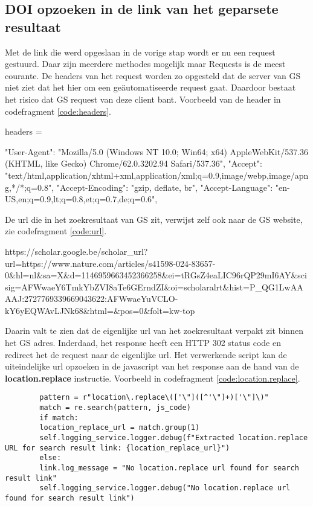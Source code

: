 \subsection{DOI opzoeken in de link van het geparsete resultaat}
Met de link die werd opgeslaan in de vorige stap wordt er nu een request gestuurd. Daar zijn meerdere methodes mogelijk maar Requests \textcite{Requests2025} is de meest courante. De headers van het request worden zo opgesteld dat de server van GS niet ziet dat het hier om een geäutomatiseerde request gaat. Daardoor bestaat het risico dat GS request van deze client bant. Voorbeeld van de header in codefragment \ref{code:headers}.\\
\begin{listing}headers = {
        "User-Agent": "Mozilla/5.0 (Windows NT 10.0; Win64; x64) AppleWebKit/537.36 (KHTML, like Gecko) Chrome/62.0.3202.94 Safari/537.36",
        "Accept": "text/html,application/xhtml+xml,application/xml;q=0.9,image/webp,image/apng,*/*;q=0.8",
        "Accept-Encoding": "gzip, deflate, br",
        "Accept-Language": "en-US,en;q=0.9,lt;q=0.8,et;q=0.7,de;q=0.6",
        \caption[Voorbeeld header]{Voorbeeld headers.}
        \label{code:headers}
}\end{listing}
De url die in het zoekresultaat van GS zit, verwijst zelf ook naar de GS website, zie codefragment \ref{code:url}.
\begin{listing}
    https://scholar.google.be/scholar\_url?url=https://www.nature.com/articles/s41598-024-83657-0\&hl=nl\&sa=X\&d=1146959663452366258\&ei=tRGsZ4eaLIC96rQP29mI6AY\&scisig=AFWwaeY6TmkYbZVI8aTe6GErndZI\&oi=scholaralrt\&hist=P\_QG1LwAAAAJ:2727769339669043622:AFWwaeYuVCLO-kY6yEQWAvLJNk68\&html=\&pos=0\&folt=kw-top
    \caption[Embedded url]{Embedded url.}
    \label{code:url}
\end{listing}
Daarin valt te zien dat de eigenlijke url van het zoekresultaat verpakt zit binnen het GS adres.
Inderdaad, het response heeft een HTTP 302 status code en redirect het de request naar de eigenlijke url.
Het verwerkende script kan de uiteindelijke url opzoeken in de javascript van het response aan de hand van de \textbf{location.replace} instructie. Voorbeeld in codefragment \ref{code:location.replace}.
\begin{listing}
    \begin{verbatim}
        pattern = r"location\.replace\(['\"]([^'\"]+)['\"]\)"
        match = re.search(pattern, js_code)
        if match:
        location_replace_url = match.group(1)
        self.logging_service.logger.debug(f"Extracted location.replace URL for search result link: {location_replace_url}")
        else:
        link.log_message = "No location.replace url found for search result link"
        self.logging_service.logger.debug("No location.replace url found for search result link")
    \end{verbatim}
    \caption[Location replace codefragment]{Codefragment voor het vinden van de location.replace.}
    \label{code:location.replace}
 \end{listing}
